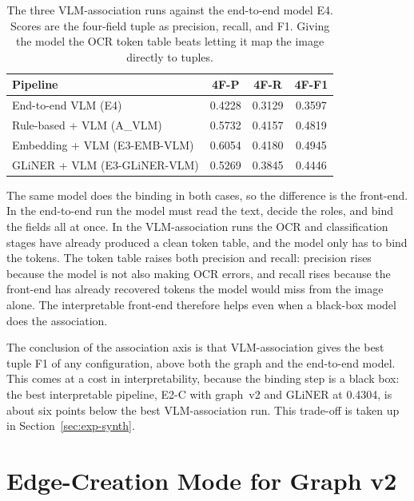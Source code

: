 \begin{table}[htbp]
  \centering
  \caption[VLM association versus the end-to-end model]{The three
    VLM-association runs against the end-to-end model E4. Scores are the
    four-field tuple as precision, recall, and F1. Giving the model the OCR
    token table beats letting it map the image directly to tuples.}
  \label{tab:vlm-vs-e2e}
  \small
  \begin{tabular}{@{}lccc@{}}
    \toprule
    \textbf{Pipeline} & \textbf{4F-P} & \textbf{4F-R} & \textbf{4F-F1} \\
    \midrule
    End-to-end VLM (E4)              & 0.4228 & 0.3129 & 0.3597 \\
    \addlinespace
    Rule-based + VLM (A\_VLM)        & 0.5732 & 0.4157 & 0.4819 \\
    Embedding + VLM (E3-EMB-VLM)     & 0.6054 & 0.4180 & 0.4945 \\
    GLiNER + VLM (E3-GLiNER-VLM)     & 0.5269 & 0.3845 & 0.4446 \\
    \bottomrule
  \end{tabular}
\end{table}

The same model does the binding in both cases, so the difference is the
front-end. In the end-to-end run the model must read the text, decide the
roles, and bind the fields all at once. In the VLM-association runs the OCR
and classification stages have already produced a clean token table, and
the model only has to bind the tokens. The token table raises both
precision and recall: precision rises because the model is not also making
OCR errors, and recall rises because the front-end has already recovered
tokens the model would miss from the image alone. The interpretable
front-end therefore helps even when a black-box model does the
association.

The conclusion of the association axis is that VLM-association gives the
best tuple F1 of any configuration, above both the graph and the
end-to-end model. This comes at a cost in interpretability, because the
binding step is a black box: the best interpretable pipeline, E2-C with
graph~v2 and GLiNER at 0.4304, is about six points below the best
VLM-association run. This trade-off is taken up in
Section~\ref{sec:exp-synth}.

\section{Edge-Creation Mode for Graph v2}\label{sec:exp-edge}

